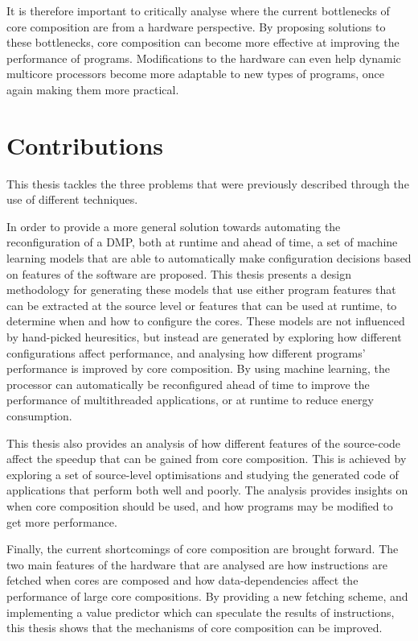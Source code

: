 It is therefore important to critically analyse where the current bottlenecks of core composition are from a hardware perspective.
By proposing solutions to these bottlenecks, core composition can become more effective at improving the performance of programs.
Modifications to the hardware can even help dynamic multicore processors become more adaptable to new types of programs, once again making them more practical.


\section{Contributions}
This thesis tackles the three problems that were previously described through the use of different techniques.

In order to provide a more general solution towards automating the reconfiguration of a DMP, both at runtime and ahead of time, a set of machine learning models that are able to automatically make configuration decisions based on features of the software are proposed.
This thesis presents a design methodology for generating these models that use either program features that can be extracted at the source level or features that can be used at runtime, to determine when and how to configure the cores.
These models are not influenced by hand-picked heuresitics, but instead are generated by exploring how different configurations affect performance, and analysing how different programs' performance is improved by core composition.
By using machine learning, the processor can automatically be reconfigured ahead of time to improve the performance of multithreaded applications, or at runtime to reduce energy consumption.

This thesis also provides an analysis of how different features of the source-code affect the speedup that can be gained from core composition.
This is achieved by exploring a set of source-level optimisations and studying the generated code of applications that perform both well and poorly.
The analysis provides insights on when core composition should be used, and how programs may be modified to get more performance.

Finally, the current shortcomings of core composition are brought forward.
The two main features of the hardware that are analysed are how instructions are fetched when cores are composed and how data-dependencies affect the performance of large core compositions.
By providing a new fetching scheme, and implementing a value predictor which can speculate the results of instructions, this thesis shows that the mechanisms of core composition can be improved.


